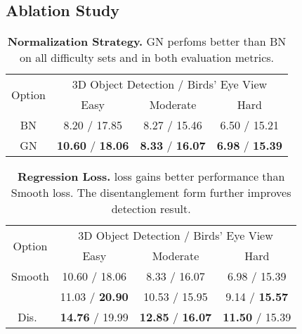 \documentclass[10pt,twocolumn,letterpaper]{article}
\begin{document}
\subsection{Ablation Study}

\label{abla_sty}
    \begin{table}[t]
    \centering
        \begin{tabular}{c||ccc}
        \hline
        \multirow{2}{*}{Option} & \multicolumn{3}{c}{3D Object Detection / Birds' Eye View}          \\ \cline{2-4} 
                        & Easy                                & Moderate                         & Hard        \\ \hline
        BN              & 8.20 / 17.85                        & 8.27 / 15.46                     & 6.50 / 15.21   \\
        GN              & \textbf{10.60} / \textbf{18.06}     & \textbf{8.33} / \textbf{16.07}   & \textbf{6.98} / \textbf{15.39}   \\ \hline
    
        \end{tabular}\vspace{2mm}
        \caption{\textbf{Normalization Strategy.} GN perfoms better than BN on all difficulty sets and in both evaluation metrics.}
        \label{normal_strat} \vspace{-3mm}
    \end{table}

    \begin{table}[t]
    \centering
        \begin{tabular}{c||ccc}
        \hline
        \multirow{2}{*}{Option} & \multicolumn{3}{c}{3D Object Detection / Birds' Eye View}          \\ \cline{2-4} 
                        & Easy                                & Moderate                         & Hard        \\ \hline
        Smooth        & 10.60 / 18.06                       & 8.33 / 16.07                     & 6.98 / 15.39   \\
                      & 11.03 / \textbf{20.90}              & 10.53 / 15.95                    & 9.14 / \textbf{15.57}   \\ 
        Dis.~          & \textbf{14.76} / 19.99              & \textbf{12.85} / \textbf{16.07}  & \textbf{11.50} / 15.39   \\ \hline    
        \end{tabular}\vspace{2mm}
        \caption{\textbf{Regression Loss.}  loss gains better performance than Smooth  loss. The disentanglement form further improves detection result.}
        \label{reg_loss}\vspace{-3mm}
    \end{table}
\end{document}
